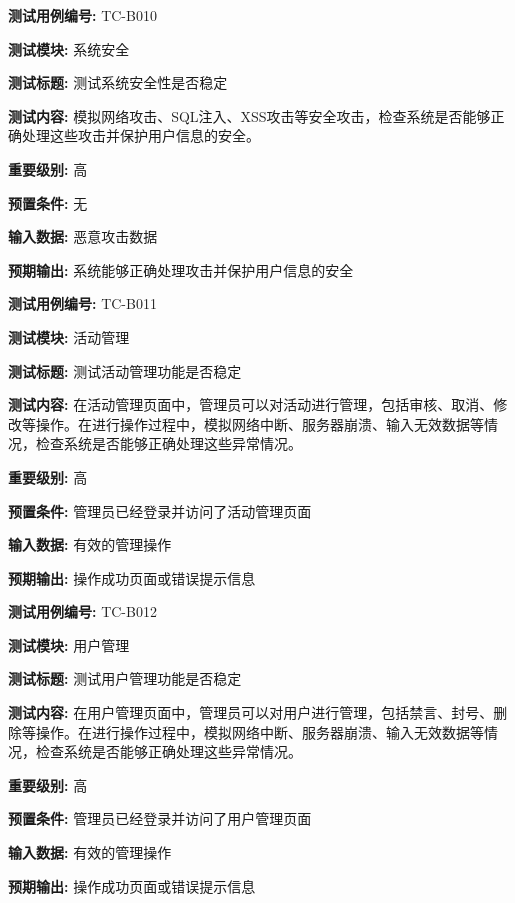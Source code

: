 \begin{framed} \textbf{测试用例编号:} TC-B010

\textbf{测试模块:} 系统安全

\textbf{测试标题:} 测试系统安全性是否稳定

\textbf{测试内容:} 模拟网络攻击、SQL注入、XSS攻击等安全攻击，检查系统是否能够正确处理这些攻击并保护用户信息的安全。

\textbf{重要级别:} 高

\textbf{预置条件:} 无

\textbf{输入数据:} 恶意攻击数据

\textbf{预期输出:} 系统能够正确处理攻击并保护用户信息的安全

\begin{center}  \end{center} \end{framed}

\begin{framed} \textbf{测试用例编号:} TC-B011

\textbf{测试模块:} 活动管理

\textbf{测试标题:} 测试活动管理功能是否稳定

\textbf{测试内容:} 在活动管理页面中，管理员可以对活动进行管理，包括审核、取消、修改等操作。在进行操作过程中，模拟网络中断、服务器崩溃、输入无效数据等情况，检查系统是否能够正确处理这些异常情况。

\textbf{重要级别:} 高

\textbf{预置条件:} 管理员已经登录并访问了活动管理页面

\textbf{输入数据:} 有效的管理操作

\textbf{预期输出:} 操作成功页面或错误提示信息

\begin{center}  \end{center} \end{framed}

\begin{framed} \textbf{测试用例编号:} TC-B012

\textbf{测试模块:} 用户管理

\textbf{测试标题:} 测试用户管理功能是否稳定

\textbf{测试内容:} 在用户管理页面中，管理员可以对用户进行管理，包括禁言、封号、删除等操作。在进行操作过程中，模拟网络中断、服务器崩溃、输入无效数据等情况，检查系统是否能够正确处理这些异常情况。

\textbf{重要级别:} 高

\textbf{预置条件:} 管理员已经登录并访问了用户管理页面

\textbf{输入数据:} 有效的管理操作

\textbf{预期输出:} 操作成功页面或错误提示信息

\begin{center}  \end{center} \end{framed}

